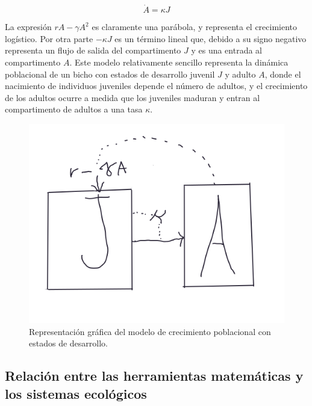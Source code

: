 \documentclass[
]{book}
\begin{document}
\begin{equation}
    \dot{A} = \kappa J \label{eq:ad}
\end{equation}

La expresión \(rA - \gamma A^2\) es claramente una parábola, y representa el crecimiento logístico. Por otra parte \(- \kappa J\) es un término lineal que, debido a su signo negativo representa un flujo de salida del compartimento \(J\) y es una entrada al compartimento \(A\). Este modelo relativamente sencillo representa la dinámica poblacional de un bicho con estados de desarrollo juvenil \(J\) y adulto \(A\), donde el nacimiento de individuos juveniles depende el número de adultos, y el crecimiento de los adultos ocurre a medida que los juveniles maduran y entran al compartimento de adultos a una tasa \(\kappa\).

\begin{figure}

{\centering \includegraphics[width=7.29in]{Unidad-I/juve-adult} 

}

\caption{Representación gráfica del modelo de crecimiento poblacional con estados de desarrollo.}\label{fig:juve-ad}
\end{figure}

\hypertarget{relaciuxf3n-entre-las-herramientas-matemuxe1ticas-y-los-sistemas-ecoluxf3gicos}{%
\subsection{Relación entre las herramientas matemáticas y los sistemas ecológicos}\label{relaciuxf3n-entre-las-herramientas-matemuxe1ticas-y-los-sistemas-ecoluxf3gicos}}
\end{document}

